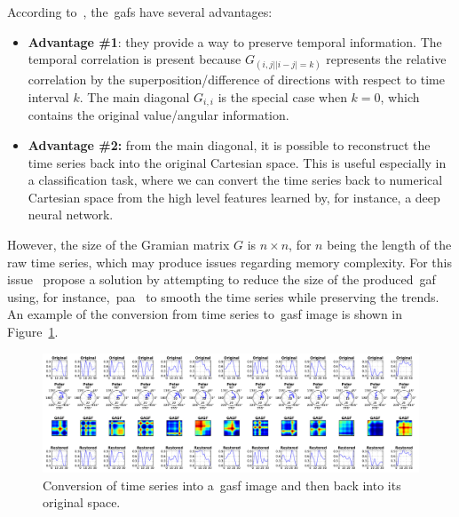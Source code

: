 According to~\cite{wang_imaging_2015}, the~\gls{gaf}s have several advantages:

\begin{itemize}[leftmargin=*,labelsep=5.8mm]
\item \textbf{{Advantage \#1}}: they provide a way to preserve temporal information. The temporal correlation is present because $G_{(i,j||i-j|=k)}$ represents the relative correlation by the superposition/difference of directions with respect to time interval $k$. The main diagonal $G_{i,i}$ is the special case when $k = 0$, which contains the original value/angular information. 
\item \textbf{{Advantage \#2:}} from the main diagonal, it is possible to reconstruct the time series back into the original Cartesian space. This is useful especially in a classification task, where we can convert the time series back to numerical Cartesian space from the high level features learned by, for instance, a deep neural network.
\end{itemize}

However, the size of the Gramian matrix $G$ is $n \times n$, for $n$ being the length of the raw time series, which may produce issues regarding memory complexity. For this issue~\cite{wang_imaging_2015} propose a solution by attempting to reduce the size of the produced~\gls{gaf} using, for instance,~\gls{paa}~\citep{keogh_scaling_2000} to smooth the time series while preserving the trends. An example of the conversion from time series to~\gls{gasf} image is shown in Figure~\ref{figure:gasf_example}.

\begin{figure} [h]
\centering
\includegraphics[width=\textwidth]{images/05-modeling/gasfpipeline} 
 \caption{Conversion of time series into a~\gls{gasf} image and then back into its original space.}
 \label{figure:gasf_example}
\end{figure}

